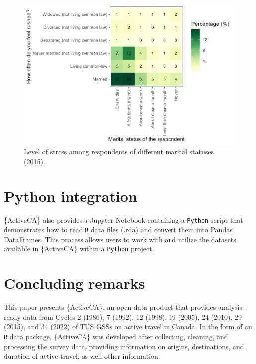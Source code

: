 \documentclass[Royal,times,sageh]{sagej}
\begin{document}
\begin{figure}

{\centering \includegraphics[width=1\linewidth]{Manuscript-figures/main_stress_figure} 

}

\caption{Level of stress among respondents of different marital statuses (2015).}\label{fig:figure-stress}
\end{figure}

\section{Python integration}\label{python-integration}

\{ActiveCA\} also provides a Jupyter Notebook containing a
\texttt{Python} script that demonstrates how to read \texttt{R} data
files (.rda) and convert them into Pandas DataFrames. This process
allows users to work with and utilize the datasets available in
\{ActiveCA\} within a \texttt{Python} project.

\section{Concluding remarks}\label{concluding-remarks}

This paper presents \{ActiveCA\}, an open data product that provides
analysis-ready data from Cycles 2 (1986), 7 (1992), 12 (1998), 19
(2005), 24 (2010), 29 (2015), and 34 (2022) of TUS GSSs on active travel
in Canada. In the form of an \texttt{R} data package, \{ActiveCA\} was
developed after collecting, cleaning, and processing the survey data,
providing information on origins, destinations, and duration of active
travel, as well other information.
\end{document}
